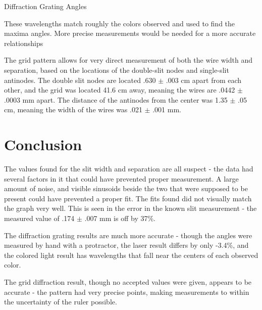 \documentclass[journal]{IEEEtran}
\begin{document}
\begin{table}[ht]
\centering
\caption{\normalsize{Diffraction Grating Angles}}
\medskip
\caption{Table 1: Multi-wavelength diffraction grating angles.}
\end{table}

These wavelengths match roughly the colors observed and used to find the maxima
angles. More precise measurements would be needed for a more accurate
relationships

The grid pattern allows for very direct measurement of both the wire width and
separation, based on the locations of the double-slit nodes and single-slit
antinodes. The double slit nodes are located .630 $\pm$ .003 cm apart from each
other, and the grid was located 41.6 cm away, meaning the wires are .0442 $\pm$
.0003 mm apart. The distance of the antinodes from the center was 1.35 $\pm$
.05 cm, meaning the width of the wires was .021 $\pm$ .001 mm.

\section{Conclusion}

The values found for the slit width and separation are all suspect - the data
had several factors in it that could have prevented proper measurement. A large
amount of noise, and visible sinusoids beside the two that were supposed to be
present could have prevented a proper fit. The fits found did not visually
match the graph very well. This is seen in the error in the known slit
measurement - the measured value of .174 $\pm$ .007 mm is off by 37\%.

The diffraction grating results are much more accurate - though the angles were
measured by hand with a protractor, the laser result differs by only -3.4\%,
and the colored light result has wavelengths that fall near the centers of each
observed color.

The grid diffraction result, though no accepted values were given, appears to
be accurate - the pattern had very precise points, making measurements to
within the uncertainty of the ruler possible.
\end{document}
